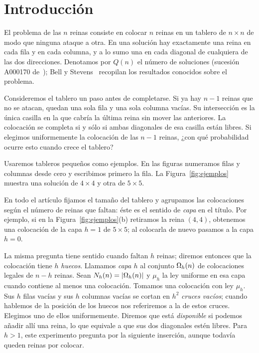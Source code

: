 \section{Introducción}\label{sec:intro}

El problema de las $n$ reinas consiste en colocar $n$ reinas en un tablero de
$n\times n$ de modo que ninguna ataque a otra. En una solución hay exactamente una
reina en cada fila y en cada columna, y a lo sumo una en cada diagonal de cualquiera
de las dos direcciones. Denotamos por $Q(n)$ el número de soluciones (sucesión A000170
de~\cite{OEIS}); Bell y Stevens~\cite{BellStevens} recopilan los resultados conocidos sobre el
problema.

Consideremos el tablero un paso antes de completarse. Si ya hay $n-1$ reinas que
no se atacan, quedan una sola fila y una sola columna vacías. Su intersección es
la única casilla en la que cabría la última reina sin mover las anteriores. La
colocación se completa si y sólo si ambas diagonales de esa casilla están libres.
Si elegimos uniformemente la colocación de las $n-1$ reinas, ¿con qué probabilidad
ocurre esto cuando crece el tablero?

Usaremos tableros pequeños como ejemplos. En las figuras numeramos filas y columnas
desde cero y escribimos primero la fila. La Figura~\ref{fig:ejemplos} muestra una
solución de $4\times4$ y otra de $5\times5$.



En todo el artículo fijamos el tamaño del tablero y agrupamos las colocaciones según
el número de reinas que faltan: éste es el sentido de \emph{capa} en el título. Por
ejemplo, si en la Figura~\ref{fig:ejemplos}(b) retiramos la reina $(4,4)$, obtenemos
una colocación de la capa $h=1$ de $5\times5$; al colocarla de nuevo pasamos a la
capa $h=0$.

La misma pregunta tiene sentido cuando faltan $h$ reinas; diremos entonces que la
colocación tiene $h$ \emph{huecos}. Llamamos \emph{capa $h$}
al conjunto $\Omega_h(n)$ de colocaciones legales de $n-h$ reinas. Sean
$N_h(n)=|\Omega_h(n)|$ y $\mu_h$ la ley uniforme en esa capa cuando contiene al menos
una colocación. Tomamos una colocación con ley $\mu_h$. Sus $h$ filas vacías y sus
$h$ columnas vacías se cortan en $h^2$ \emph{cruces vacíos}; cuando hablemos de la posición de los
huecos nos referiremos a la de estos cruces. Elegimos uno de ellos
uniformemente. Diremos que
está \emph{disponible} si podemos añadir allí una reina, lo que equivale a que sus dos
diagonales estén libres. Para $h>1$, este experimento pregunta por la siguiente
inserción, aunque todavía queden reinas por colocar.

